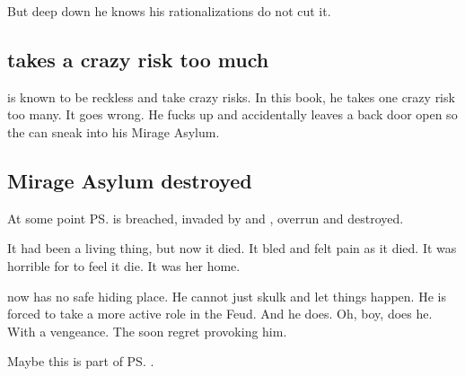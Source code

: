 
But deep down he knows his rationalizations do not cut it. 










\subsection{\Ishnaruchaefir{} takes a crazy risk too much}
\QuessanthIshnaruchaefir{} is known to be reckless and take crazy risks. 
In this book, he takes one crazy risk too many. 
It goes wrong. 
He fucks up and accidentally leaves a back door open so the \resphain{} can sneak into his Mirage Asylum. 







\subsection{Mirage Asylum destroyed}
At some point \ps{\Ishnaruchaefir}  is breached, invaded by \resphain{} and \banes, overrun and destroyed.
 
It had been a living thing, but now it died. 
It bled and felt pain as it died. 
It was horrible for \Criseis to feel it die.
It was her home. 

\Ishnaruchaefir{} now has no safe hiding place. 
He cannot just skulk and let things happen. 
He is forced to take a more active role in the Feud. 
And he does. 
Oh, boy, does he. 
With a vengeance. 
The \resphain{} soon regret provoking him. 

Maybe this is part of \ps{\Azraid} . 

